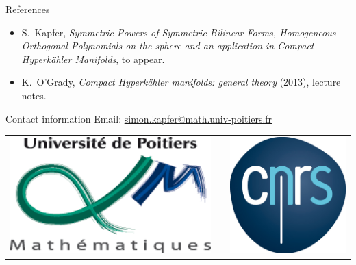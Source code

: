 \documentclass[final]{beamer}
\newlength{\onecolwid}
\begin{document}
\begin{frame}[t]
\begin{columns}[t]
\begin{column}{\onecolwid}

\begin{block}{References}

\begin{itemize}
\small
\item S.~Kapfer, \emph{Symmetric Powers of Symmetric Bilinear Forms, Homogeneous Orthogonal Polynomials on the sphere and an application in Compact Hyperk\"ahler Manifolds}, to appear.
\item K.~O'Grady, \emph{Compact Hyperk\"ahler manifolds: general theory} (2013), lecture notes.
\end{itemize}
\vspace{-1cm}
\end{block}




\begin{block}{Contact information}
Email: \href{mailto:simon.kapfer@math.univ-poitiers.fr}{simon.kapfer@math.univ-poitiers.fr}
\end{block}

\begin{center}
\begin{tabular}{ccc}
\includegraphics[height=45mm]{logo-Dept-Math-1.png} & \hspace{4cm} & \includegraphics[height=45mm]{logo-cnrs2.jpg}
\end{tabular}
\end{center}


\end{column}
\end{columns}
\end{frame}
\end{document}
